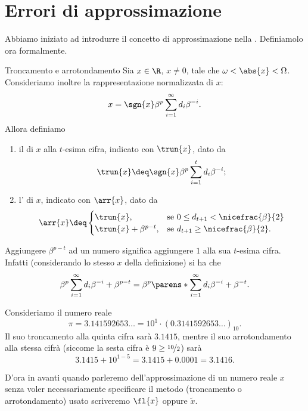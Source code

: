 \section{Errori di approssimazione}

Abbiamo iniziato ad introdurre il concetto di approssimazione nella . Definiamolo ora formalmente.

\begin{definition}
    {Troncamento e arrotondamento}{}
    Sia $x \in \R$, $x \neq 0$, tale che $\omega < \abs{x} < \Omega$. Consideriamo inoltre la rappresentazione normalizzata di $x$: \[
        x = \sgn{x}\beta^p\sum_{i=1}^{\infty} d_i\beta^{-i}.
    \] 
    Allora definiamo \begin{enumerate}[(1)]
        \item il  di $x$ alla $t$-esima cifra, indicato con $\trun{x}$, dato da \[
            \trun{x} \deq \sgn{x}\beta^p\sum_{i=1}^t d_i\beta^{-i};
        \]
        \item l' di $x$, indicato con $\arr{x}$, dato da \[
            \arr{x} \deq \begin{cases}
                \trun{x}, &\text{se } 0 \leq d_{t+1} < \nicefrac{\beta}{2}\\
                \trun{x} + \beta^{p-t}, &\text{se } d_{t+1} \geq \nicefrac{\beta}{2}.
            \end{cases}
        \] 
    \end{enumerate} 
\end{definition}

\begin{remark}
    Aggiungere $\beta^{p-t}$ ad un numero significa aggiungere $1$ alla sua $t$-esima cifra. Infatti (considerando lo stesso $x$ della definizione) si ha che \[
        \beta^p\sum_{i=1}^\infty d_i\beta^{-i} + \beta^{p-t} = \beta^p\parens*{\sum_{i=1}^\infty d_i\beta^{-i} + \beta^{-t}}.    
    \] 
\end{remark}

\begin{example}
    Consideriamo il numero reale \[
        \pi = 3.141592653\dots = 10^1 \cdot (0.3141592653\dots)_{10}.
    \] Il suo troncamento alla quinta cifra sarà $3.1415$, mentre il suo arrotondamento alla stessa cifrà (siccome la sesta cifra è $9 \geq \nicefrac{10}{2}$) sarà \[
        3.1415 + 10^{1 - 5} = 3.1415 + 0.0001 = 3.1416.
    \]
\end{example}

D'ora in avanti quando parleremo dell'approssimazione di un numero reale $x$ senza voler necessariamente specificare il metodo (troncamento o arrotondamento) usato scriveremo $\fl{x}$ oppure $\tilde{x}$.  

